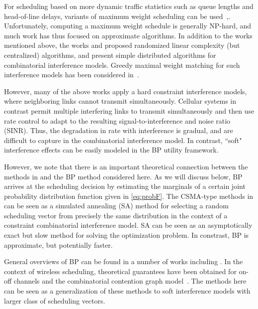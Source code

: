 \documentclass[letterpaper,twocolumn,twoside]{IEEEtran}
\begin{document}
For scheduling based on more dynamic traffic statistics such as
queue lengths and head-of-line delays, variants of maximum weight
scheduling can be used~\cite{Tassiulas:98},\cite{shakkottai_2001}.
Unfortunately, computing a maximum weight schedule is generally
NP-hard, and much work has thus focused on approximate algorithms.
In addition to the works mentioned above,
the works \cite{Tassiulas:98} and \cite{GiacconePS:03} proposed
randomized linear complexity (but centralized) algorithms, and
\cite{JiangWal:08,RajagopalanSS:09,NiSrikant:09} present simple distributed
algorithms for combinatorial interference models. Greedy maximal
weight matching for such interference models has been considered
in~\cite{DimakisW:06,JooLinShroff:09,LeconteNS:09}.

However, many of the above works apply a hard constraint
interference models, where neighboring links cannot transmit
simultaneously. Cellular systems in contrast permit multiple
interfering links to transmit simultaneously and then use rate
control to adapt to the resulting signal-to-interference and noise
ratio (SINR). Thus, the degradation in rate with interference is
gradual, and are difficult to capture in the combinatorial
interference model. In contrast, ``soft" interference effects can be
easily modeled in the BP utility framework.

However, we note that there is an important theoretical connection
between the methods in \cite{JiangWal:08,RajagopalanSS:09} and
the BP method considered here. As we will discuss below, BP arrives
at the scheduling decision by estimating the marginals of a certain
joint probability distribution function given in \eqref{eq:probF}.
The CSMA-type methods in \cite{JiangWal:08,RajagopalanSS:09}
can be seen as a simulated annealing
(SA) method for selecting a random scheduling vector from precisely
the same distribution in the context of a constraint combinatorial
interference model. SA can be seen as an asymptotically
exact but slow method \cite{Hajek:88} for solving the optimization problem.
In constrast, BP is approximate, but potentially faster.

General overviews of BP can be found in a number of works including
\cite{Pearl:88,WainwrightJ:08}. In the context of wireless
scheduling, theoretical guarantees have been obtained for on-off
channels and the combinatorial contention graph
model~\cite{SanghaviMW:07, BayatiSS:08}. The methods here can be
seen as a generalization of these methods to soft interference
models with larger class of scheduling vectors.
\end{document}
